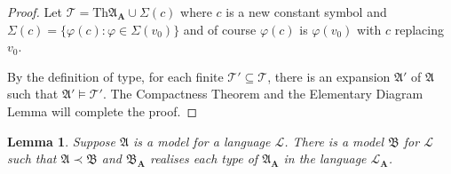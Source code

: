 \documentclass[titlepage, oneside]{amsbook}
\theoremstyle{plain}
\newtheorem{lemma}{Lemma}
\theoremstyle{definition}
\theoremstyle{remark}
\newcommand{\Th}{\ensuremath{\mbox{Th}}}
\newcommand{\sv}[1][v_0]{\ensuremath{\Sigma ( #1) }}
\newcommand{\theory}{\ensuremath{\mathcal{T}}}
\newcommand{\lan}{\ensuremath{\mathcal{L}}}
\newcommand{\seq}{\ensuremath{\subseteq}}
\newcommand{\ma}{\ensuremath{\mathfrak{A}}}
\newcommand{\mb}{\ensuremath{\mathfrak{B}}}
\newcommand{\ba}{\ensuremath{\mathbf{A}}}
\begin{document}
\begin{proof} Let $\theory  = \Th \ma_\ba  \cup \sv[c] $ where $c$ is
a 
new constant symbol and  $\sv[c] =  \{ \varphi ( c ) : \varphi \in \sv \}$ 
and of course $\varphi ( c )$ is 
$\varphi (v_0 )$ with $c$ replacing $v_0$.

By the definition of type, for each finite $\theory' \seq \theory$, there is 
an expansion $\ma'$ of $\ma$ such that $\ma' \models \theory'$. 
The Compactness Theorem and the Elementary Diagram Lemma will complete
the proof.

\end{proof}

\begin{lemma}\label{L:Type}  Suppose $\ma$ is a model for a language
$\lan$.  There is a model $\mb$ for $\lan$ such that $\ma \prec \mb$
and $\mb_\ba$ realises each type of $\ma_\ba$ in the language
$\lan_\ba$.

\end{lemma}
\end{document}
